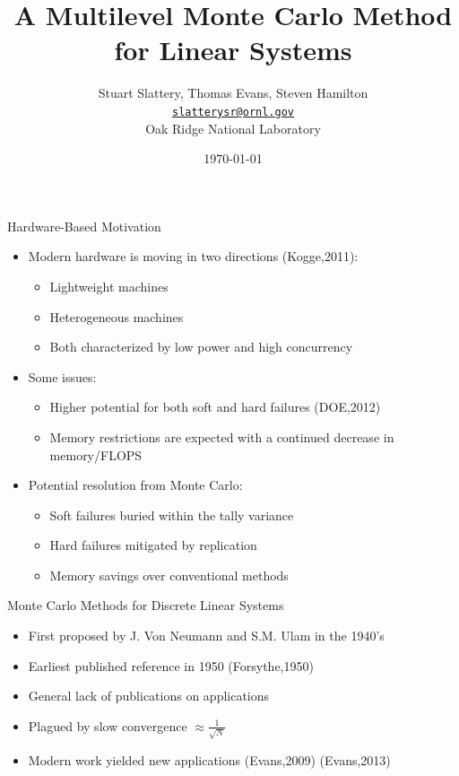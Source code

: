 \documentclass{beamer}
\author[Stuart Slattery]{Stuart Slattery, Thomas Evans, Steven
  Hamilton\\
  \bigskip
  \href{mailto:slatterysr@ornl.gov}{\texttt{slatterysr@ornl.gov}} \\
  \bigskip
  Oak Ridge National Laboratory}
\date{\today}
\title[Multilevel Monte Carlo \hspace{1mm}
  \insertframenumber/\inserttotalframenumber]{A Multilevel Monte Carlo
  Method for Linear Systems}
\begin{document}
\maketitle

\begin{frame}{Hardware-Based Motivation}

  \begin{itemize}
  \item Modern hardware is moving in two directions (Kogge,2011):
    \begin{itemize}
    \item Lightweight machines
    \item Heterogeneous machines
    \item Both characterized by low power and high concurrency
    \end{itemize}
    \medskip \medskip
  \item Some issues:
    \begin{itemize}
    \item Higher potential for both soft and hard failures (DOE,2012)
    \item Memory restrictions are expected with a continued decrease
      in memory/FLOPS
    \end{itemize}
    \medskip \medskip
  \item Potential resolution from Monte Carlo:
    \begin{itemize}
    \item Soft failures buried within the tally variance
    \item Hard failures mitigated by replication
    \item Memory savings over conventional methods
    \end{itemize}
  \end{itemize}

\end{frame}

\begin{frame}{Monte Carlo Methods for Discrete Linear Systems}

  \begin{itemize}
  \item First proposed by J. Von Neumann and S.M. Ulam in the 1940's
    \medskip \medskip
  \item Earliest published reference in 1950 (Forsythe,1950)
    \medskip \medskip
  \item General lack of publications on applications
    \medskip \medskip
  \item Plagued by slow convergence $\approx \frac{1}{\sqrt{N}}$
    \medskip \medskip
  \item Modern work yielded new applications (Evans,2009) (Evans,2013)
  \end{itemize}

\end{frame}
\end{document}
